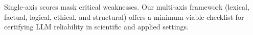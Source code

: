 \documentclass[11pt]{article}
\begin{document}
\begin{tcolorbox}[colframe=gray!25,colback=gray!10,title=Takeaway]
Single-axis scores mask critical weaknesses.  
Our multi-axis framework (lexical, factual, logical, ethical, and structural) offers a minimum viable checklist for certifying LLM reliability in scientific and applied settings.
\end{tcolorbox}

\printbibliography
\end{document}
